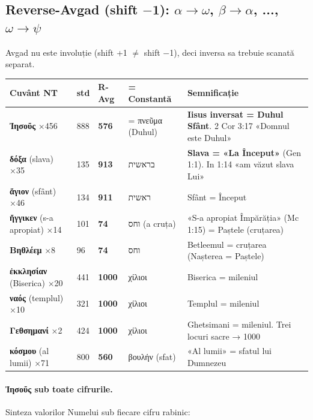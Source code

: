 \documentclass[12pt,a4paper,twoside,openany]{book}
\begin{document}
\subsection{Reverse-Avgad (shift $-$1): $\alpha \to \omega$, $\beta \to \alpha$, ..., $\omega \to \psi$}

Avgad nu este involuție (shift +1 $\neq$ shift $-$1), deci inversa sa trebuie scanată separat.

\begin{center}
\footnotesize
\begin{tabular}{L{2.6cm}C{0.8cm}C{1cm}L{2.5cm}L{6.3cm}}
\toprule
{}
\textbf{Cuvânt NT} & \textbf{std} & \textbf{R-Avg} & \textbf{= Constantă} & \textbf{Semnificație} \\
\midrule
\textbf{Ἰησοῦς} ×456 & 888 & \textbf{576} & = πνεῦμα (Duhul) & \textbf{Iisus inversat = Duhul Sfânt}. 2 Cor 3:17 «Domnul este Duhul» \\
\textbf{δόξα} (slava) ×35 & 135 & \textbf{913} & בראשית & \textbf{Slava = «La Început»} (Gen 1:1). In 1:14 «am văzut slava Lui» \\
\textbf{ἅγιον} (sfânt) ×46 & 134 & \textbf{911} & ראשית & Sfânt = Început \\
\textbf{ἤγγικεν} (s-a apropiat) ×14 & 101 & \textbf{74} & וחס (a cruța) & «S-a apropiat Împărăția» (Mc 1:15) = Paștele (cruțarea) \\
\textbf{Βηθλέεμ} ×8 & 96 & \textbf{74} & וחס & Betleemul = cruțarea (Nașterea = Paștele) \\
\textbf{ἐκκλησίαν} (Biserica) ×20 & 441 & \textbf{1000} & χίλιοι & Biserica = mileniul \\
\textbf{ναός} (templul) ×10 & 321 & \textbf{1000} & χίλιοι & Templul = mileniul \\
\textbf{Γεθσημανί} ×2 & 424 & \textbf{1000} & χίλιοι & Ghetsimani = mileniul. Trei locuri sacre → 1000 \\
\textbf{κόσμου} (al lumii) ×71 & 800 & \textbf{560} & βουλήν (sfat) & «Al lumii» = sfatul lui Dumnezeu \\
\bottomrule
\end{tabular}
\end{center}

\paragraph*{Ἰησοῦς sub toate cifrurile.} Sinteza valorilor Numelui sub fiecare cifru rabinic:
\end{document}
